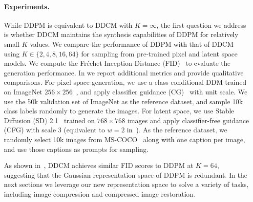 \paragraph{Experiments.}While DDPM is equivalent to DDCM with $K=\infty$, the first question we address is whether DDCM maintains the synthesis capabilities of DDPM for relatively small $K$ values.
We compare the performance of DDPM with that of DDCM using $K\in\{2,4,8,16,64\}$ for sampling from pre-trained pixel and latent space models.
We compute the Fréchet Inception Distance (FID)~\citep{heusel2017gans} to evaluate the generation performance.
In  we report additional metrics and provide qualitative comparisons.
For pixel space generation, we use a class-conditional DDM trained on ImageNet $256\times256$~\citep{deng2009imagenet,dhariwal2021diffusion}, and apply classifier guidance (CG)~\citep{dhariwal2021diffusion} with unit scale.
We use the 50k validation set of ImageNet as the reference dataset, and sample 10k class labels randomly to generate the images.
For latent space, we use Stable Diffusion (SD) 2.1~\citep{rombach2022high} trained on $768\times768$ images and apply classifier-free guidance (CFG) with scale 3 (equivalent to $w=2$ in~\citep{ho2021classifier}).
As the reference dataset, we randomly select 10k images from MS-COCO~\citep{lin2014microsoft,chen2015microsoftcococaptionsdata} along with one caption per image, and use those captions as prompts for sampling.


As shown in~, DDCM achieves similar FID scores to DDPM at $K=64$, suggesting that the Gaussian representation space of DDPM is redundant.
In the next sections we leverage our new representation space to solve a variety of tasks, including image compression and compressed image restoration.

